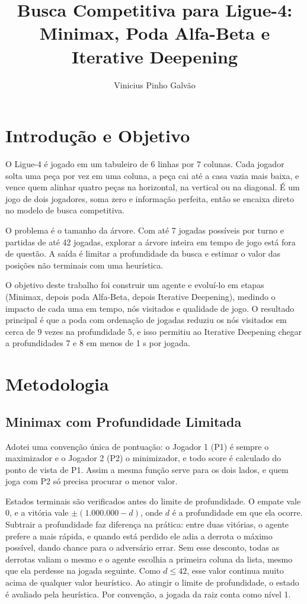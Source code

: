 \documentclass[letterpaper]{article} %
\title{Busca Competitiva para Ligue-4: Minimax, Poda Alfa-Beta e Iterative Deepening}
\author{
    Vinicius Pinho Galvão
}
\begin{document}
\maketitle

\section{Introdução e Objetivo}
O Ligue-4 é jogado em um tabuleiro de 6 linhas por 7 colunas. Cada jogador solta uma peça por vez em uma coluna, a peça cai até a casa vazia mais baixa, e vence quem alinhar quatro peças na horizontal, na vertical ou na diagonal. É um jogo de dois jogadores, soma zero e informação perfeita, então se encaixa direto no modelo de busca competitiva.

O problema é o tamanho da árvore. Com até 7 jogadas possíveis por turno e partidas de até 42 jogadas, explorar a árvore inteira em tempo de jogo está fora de questão. A saída é limitar a profundidade da busca e estimar o valor das posições não terminais com uma heurística.

O objetivo deste trabalho foi construir um agente e evoluí-lo em etapas (Minimax, depois poda Alfa-Beta, depois Iterative Deepening), medindo o impacto de cada uma em tempo, nós visitados e qualidade de jogo. O resultado principal é que a poda com ordenação de jogadas reduziu os nós visitados em cerca de 9 vezes na profundidade 5, e isso permitiu ao Iterative Deepening chegar a profundidades 7 e 8 em menos de 1 s por jogada.

\section{Metodologia}

\subsection{Minimax com Profundidade Limitada}
Adotei uma convenção única de pontuação: o Jogador 1 (P1) é sempre o maximizador e o Jogador 2 (P2) o minimizador, e todo score é calculado do ponto de vista de P1. Assim a mesma função serve para os dois lados, e quem joga com P2 só precisa procurar o menor valor.

Estados terminais são verificados antes do limite de profundidade. O empate vale 0, e a vitória vale $\pm(1.000.000 - d)$, onde $d$ é a profundidade em que ela ocorre. Subtrair a profundidade faz diferença na prática: entre duas vitórias, o agente prefere a mais rápida, e quando está perdido ele adia a derrota o máximo possível, dando chance para o adversário errar. Sem esse desconto, todas as derrotas valiam o mesmo e o agente escolhia a primeira coluna da lista, mesmo que ela perdesse na jogada seguinte. Como $d \le 42$, esse valor continua muito acima de qualquer valor heurístico. Ao atingir o limite de profundidade, o estado é avaliado pela heurística. Por convenção, a jogada da raiz conta como nível 1.
\end{document}
